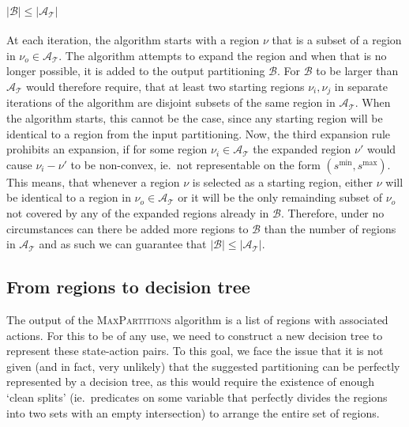 \paragraph{$|\mathcal{B}| \leq |\mathcal{A}_{\mathcal{T}}|$} At each iteration,
the algorithm starts with a region $\nu$ that is a subset of a region in
$\nu_{o} \in \mathcal{A}_{\mathcal{T}}$. The algorithm attempts to expand the region and
when that is no longer possible, it is added to the output partitioning
$\mathcal{B}$. For $\mathcal{B}$ to be larger than $\mathcal{A}_{\mathcal{T}}$
would therefore require, that at least two starting regions $\nu_{i},
\nu_{j}$ in separate iterations of the algorithm are disjoint subsets of the
same region in $\mathcal{A}_{\mathcal{T}}$. When the algorithm starts, this
cannot be the case, since any starting region will be identical to a region from
the input partitioning. Now, the third expansion rule prohibits an expansion, if
for some region $\nu_{i} \in \mathcal{A}_{\mathcal{T}}$ the expanded region
$\nu'$ would cause $\nu_{i} - \nu'$ to be non-convex, ie.\ not representable on
the form $(s^{\min}, s^{\max})$. This means, that whenever a region $\nu$ is
selected as a starting region, either $\nu$ will be identical to a region in
$\nu_{o} \in \mathcal{A}_{\mathcal{T}}$ or it will be the only remainding subset
of $\nu_{o}$ not covered by any of the expanded regions already in
$\mathcal{B}$. Therefore, under no circumstances can there be added more regions
to $\mathcal{B}$ than the number of regions in $\mathcal{A}_{\mathcal{T}}$ and
as such we can guarantee that $|\mathcal{B}| \leq |\mathcal{A}_{\mathcal{T}}|$.


\subsection{From regions to decision tree}%
\label{sub:regionsToDT}

The output of the \textsc{MaxPartitions} algorithm is a list of regions with
associated actions. For this to be of any use, we need to construct a new
decision tree to represent these state-action pairs. To this goal, we face the
issue that it is not given (and in fact, very unlikely) that the suggested
partitioning can be perfectly represented by a decision tree, as this would
require the existence of enough `clean splits' (ie.\ predicates on some variable
that perfectly divides the regions into two sets with an empty intersection) to
arrange the entire set of regions.

